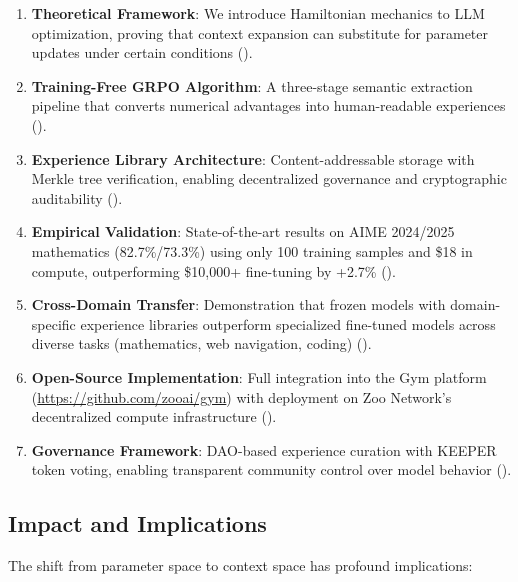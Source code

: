 \documentclass[11pt,a4paper]{article}
\begin{document}
\begin{enumerate}
    \item \textbf{Theoretical Framework}: We introduce Hamiltonian mechanics to LLM optimization, proving that context expansion can substitute for parameter updates under certain conditions ().

    \item \textbf{Training-Free GRPO Algorithm}: A three-stage semantic extraction pipeline that converts numerical advantages into human-readable experiences ().

    \item \textbf{Experience Library Architecture}: Content-addressable storage with Merkle tree verification, enabling decentralized governance and cryptographic auditability ().

    \item \textbf{Empirical Validation}: State-of-the-art results on AIME 2024/2025 mathematics (82.7\%/73.3\%) using only 100 training samples and \$18 in compute, outperforming \$10,000+ fine-tuning by +2.7\% ().

    \item \textbf{Cross-Domain Transfer}: Demonstration that frozen models with domain-specific experience libraries outperform specialized fine-tuned models across diverse tasks (mathematics, web navigation, coding) ().

    \item \textbf{Open-Source Implementation}: Full integration into the Gym platform (\url{https://github.com/zooai/gym}) with deployment on Zoo Network's decentralized compute infrastructure ().

    \item \textbf{Governance Framework}: DAO-based experience curation with KEEPER token voting, enabling transparent community control over model behavior ().
\end{enumerate}

\subsection{Impact and Implications}

The shift from parameter space to context space has profound implications:
\end{document}
